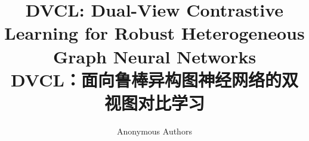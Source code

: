 \documentclass[10pt]{ctexart}
\title{DVCL: Dual-View Contrastive Learning for Robust Heterogeneous Graph Neural Networks\\
DVCL：面向鲁棒异构图神经网络的双视图对比学习}
\author{Anonymous Authors}
\date{}
\newcommand{\inputzhsection}[1]{%
  \begingroup
  \let\originalsection\section
  \renewcommand{\section}[1]{\originalsection*{中文导读：##1}}%
  \endgroup
}
\begin{document}
\maketitle





\inputzhsection{sections_zh/01_introduction_zh}


\inputzhsection{sections_zh/02_related_work_zh}


\inputzhsection{sections_zh/03_preliminaries_zh}


\inputzhsection{sections_zh/04_method_zh}


\inputzhsection{sections_zh/05_experiments_zh}


\inputzhsection{sections_zh/06_conclusion_zh}



\end{document}
